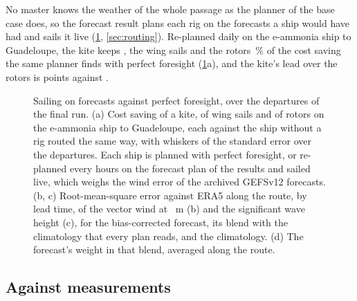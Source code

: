 No master knows the weather of the whole passage as the planner of the base case does, so the forecast result plans each rig on the forecasts a ship would have had and sails it live (\cref{fig:forecast}, \cref{sec:routing}). Re-planned daily on the  e-ammonia ship to Guadeloupe, the kite keeps \NumForecastKeptKite, the wing sails \NumForecastKeptWings{} and the rotors \NumForecastKeptRotors\,\% of the cost saving the same planner finds with perfect foresight (\cref{fig:forecast}a), and the kite's lead over the rotors is \NumForecastLeadLive{} points against \NumForecastLeadPerfect{}. 

\begin{figure}[tbp]
\centering
{}
\caption{Sailing on forecasts against perfect foresight, over the  departures of the final run. (a) Cost saving of a  kite,  of wing sails and  of rotors on the  e-ammonia ship to Guadeloupe, each against the ship without a rig routed the same way, with whiskers of the standard error over the departures. Each ship is planned with perfect foresight, or re-planned every  hours on the forecast plan of the results and sailed live, which weighs the wind error of the archived GEFSv12 forecasts. (b, c) Root-mean-square error against ERA5 along the route, by lead time, of the vector wind at ~m (b) and the significant wave height (c), for the bias-corrected forecast, its blend with the climatology that every plan reads, and the climatology. (d) The forecast's weight in that blend, averaged along the route.}
\label{fig:forecast}
\end{figure}

\subsection{Against measurements}
\label{sec:res_measured}

